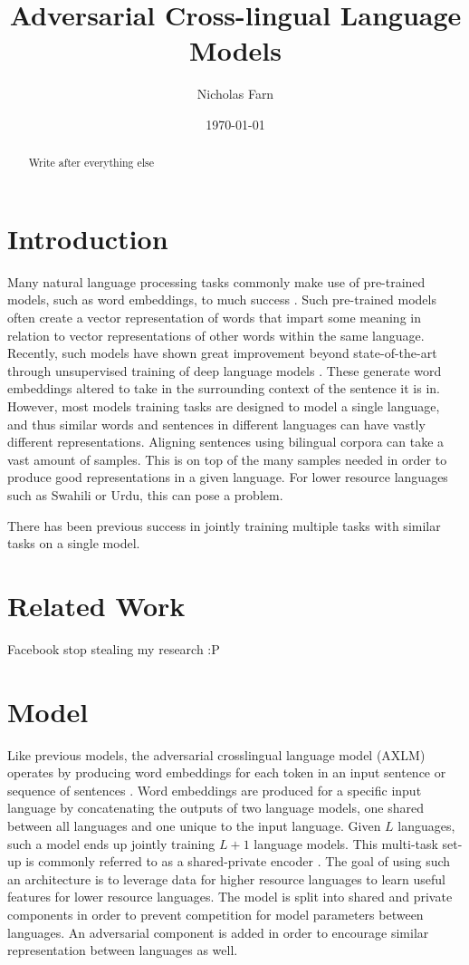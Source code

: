 \documentclass[12pt,letterpaper]{article}
\title{Adversarial Cross-lingual Language Models}
\author{Nicholas Farn}
\date{\today}
\begin{document}
\maketitle
\begin{abstract}
Write after everything else
\end{abstract}

\begin{multicols}{2}
\section{Introduction}
Many natural language processing tasks commonly make use of pre-trained models, such as word embeddings, to much success \cite{}.  Such pre-trained models often create a vector representation of words that impart some meaning in relation to vector representations of other words within the same language.  Recently, such models have shown great improvement beyond state-of-the-art through unsupervised training of deep language models \cite{bert, openai, elmo}.  These generate word embeddings altered to take in the surrounding context of the sentence it is in.  However, most models training tasks are designed to model a single language, and thus similar words and sentences in different languages can have vastly different representations.  Aligning sentences using bilingual corpora can take a vast amount of samples.  This is on top of the many samples needed in order to produce good representations in a given language.  For lower resource languages such as Swahili or Urdu, this can pose a problem.  

There has been previous success in jointly training multiple tasks with similar tasks on a single model.

\section{Related Work}
Facebook stop stealing my research :P

\section{Model}
Like previous models, the adversarial crosslingual language model (AXLM) operates by producing word embeddings for each token in an input sentence or sequence of sentences \cite{bert, openai, elmo, xlm}.  Word embeddings are produced for a specific input language by concatenating the outputs of two language models, one shared between all languages and one unique to the input language.  Given $L$ languages, such a model ends up jointly training $L+1$ language models.  This multi-task set-up is commonly referred to as a shared-private encoder \cite{Chen16}.  The goal of using such an architecture is to leverage data for higher resource languages to learn useful features for lower resource languages.  The model is split into shared and private components in order to prevent competition for model parameters between languages.  An adversarial component is added in order to encourage similar representation between languages as well.


\end{multicols}
\end{document}
